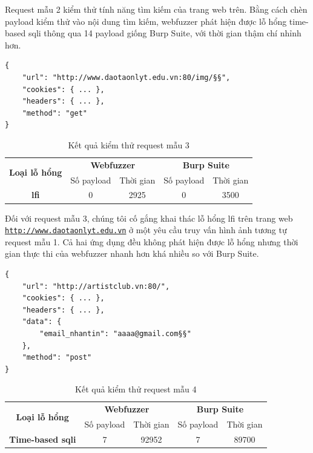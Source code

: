 \FloatBarrier
Request mẫu 2 kiểm thử tính năng tìm kiếm của trang web trên. Bằng cách chèn payload kiểm thử vào nội dung tìm kiếm, webfuzzer phát hiện được lỗ hổng time-based \acrshort{sqli} thông qua 14 payload giống Burp Suite, với thời gian thậm chí nhỉnh hơn.
\begin{lstlisting}[style=ES6, label={lst:base-request-3}, caption={Request mẫu 3}]
{
    "url": "http://www.daotaonlyt.edu.vn:80/img/§§",
    "cookies": { ... },
    "headers": { ... },
    "method": "get"
}
\end{lstlisting}
\FloatBarrier
\begin{table}[ht]
    \centering
    \caption{Kết quả kiểm thử request mẫu 3}
    \label{tab:testing-result-3}
    \begin{tabular}[ht]{ccccc}
        \toprule[1pt]\midrule[0.3pt]
            \multirow{2}{*}{\textbf{Loại lỗ hổng}}&\multicolumn{2}{c}{\textbf{Webfuzzer}}&\multicolumn{2}{c}{\textbf{Burp Suite}}\\
            \cmidrule(lr){2-3}\cmidrule(lr){4-5}{}&Số payload&Thời gian&Số payload&Thời gian\\
        \midrule[0.3pt]
            \textbf{\acrshort{lfi}}&0&2925&0&3500\\
        \midrule[0.3pt]\bottomrule[1pt]
    \end{tabular}
\end{table}
\FloatBarrier
Đối với request mẫu 3, chúng tôi cố gắng khai thác lỗ hổng \acrshort{lfi} trên trang web\\ \href{http://www.daotaonlyt.edu.vn}{\texttt{http://www.daotaonlyt.edu.vn}} ở một yêu cầu truy vấn hình ảnh tương tự request mẫu 1. Cả hai ứng dụng đều không phát hiện được lỗ hổng nhưng thời gian thực thi của webfuzzer nhanh hơn khá nhiều so với Burp Suite.
\begin{lstlisting}[style=ES6, label={lst:base-request-4}, caption={Request mẫu 4 có lỗ hổng time-based \acrshort{sqli}}]
{
    "url": "http://artistclub.vn:80/",
    "cookies": { ... },
    "headers": { ... },
    "data": {
        "email_nhantin": "aaaa@gmail.com§§"
    },
    "method": "post"
}
\end{lstlisting}
\FloatBarrier
\begin{table}[ht]
    \centering
    \caption{Kết quả kiểm thử request mẫu 4}
    \label{tab:testing-result-4}
    \begin{tabular}[ht]{ccccc}
        \toprule[1pt]\midrule[0.3pt]
            \multirow{2}{*}{\textbf{Loại lỗ hổng}}&\multicolumn{2}{c}{\textbf{Webfuzzer}}&\multicolumn{2}{c}{\textbf{Burp Suite}}\\
            \cmidrule(lr){2-3}\cmidrule(lr){4-5}{}&Số payload&Thời gian&Số payload&Thời gian\\
        \midrule[0.3pt]
            \textbf{Time-based \acrshort{sqli}}&7&92952&7&89700\\
        \midrule[0.3pt]\bottomrule[1pt]
    \end{tabular}
\end{table}
